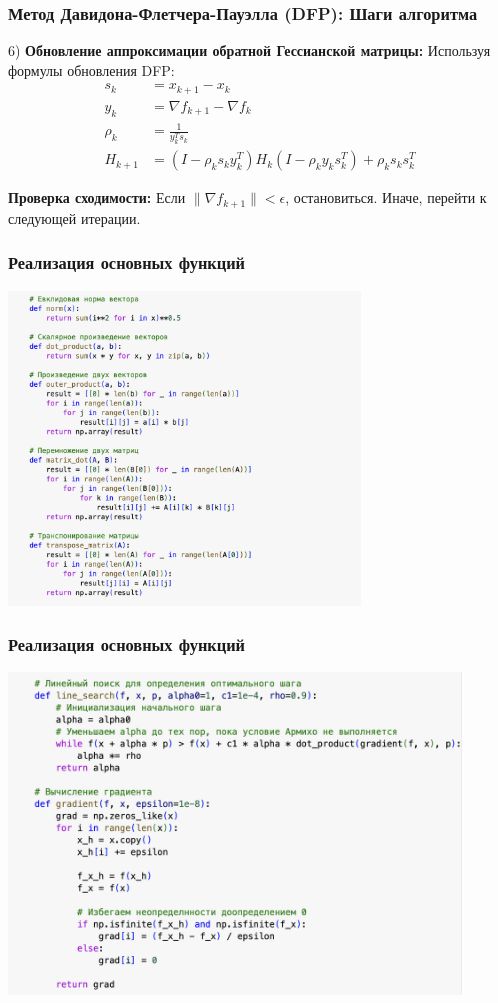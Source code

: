\documentclass[12pt,pdf,hyperref={unicode}]{beamer}
\begin{document}
\begin{frame}
\frametitle{Метод Давидона-Флетчера-Пауэлла (DFP): Шаги алгоритма}
6) \textbf{Обновление аппроксимации обратной Гессианской матрицы:} Используя формулы обновления DFP:
    \begin{align*}
        s_k &= x_{k+1} - x_k \\
        y_k &= \nabla f_{k+1} - \nabla f_k \\
        \rho_k &= \frac{1}{y_k^T s_k} \\
H_{k+1} &= \left( I - \rho_k s_k y_k^T \right) H_k \left( I - \rho_k y_k s_k^T \right) + \rho_k s_k s_k^T
    \end{align*}
    
    \item \textbf{Проверка сходимости:} Если $\|\nabla f_{k+1}\| < \epsilon$, остановиться. Иначе, перейти к следующей итерации.
\end{frame}


\begin{frame}
\frametitle{Реализация основных функций}
\begin{center}
    \includegraphics[width=0.7\textwidth]{image1.png}
\end{center}
\end{frame}

\begin{frame}
\frametitle{Реализация основных функций}
\begin{center}
    \includegraphics[width=0.9\textwidth]{image2.png}
\end{center}
\end{frame}
\end{document}

